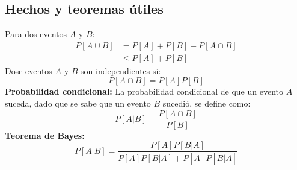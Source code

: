 \subsection{Hechos y teoremas \'utiles}
\begin{multicols}{2}
Para dos eventos $A$ y $B$:
\begin{align*}
P[A\cup B] &= P[A]+P[B]-P[A\cap B] \\
&\leq P[A]+P[B] 
\end{align*}
Dose eventos $A$ y $B$ son independientes si:
\[ P[A\cap B]=P[A]P[B] \]
\textbf{Probabilidad condicional:}
La probabilidad condicional de que un evento $A$ suceda, dado que se sabe que un evento $B$ sucedi\'o, se define como:
\[ P[A|B]=\frac{P[A\cap B]}{P[B]}\]
\textbf{Teorema de Bayes:}
\[P[A|B]=\frac{P[A]P[B|A]}{P[A]P[B|A]+P[\bar{A}]P[B|\bar{A}]}\]
\end{multicols}
